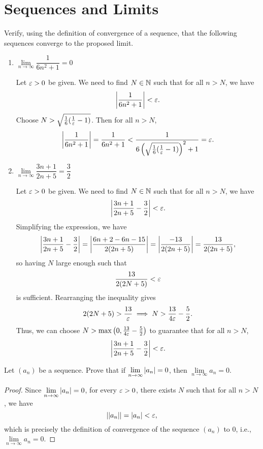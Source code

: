 \section{Sequences and Limits}

\begin{problem}
  Verify, using the definition of convergence of a sequence, that the following
  sequences converge to the proposed limit.

  \begin{enumerate}[label=(\alph*)]
    \item $\lim\limits_{n \to \infty} \dfrac{1}{6n^{2} + 1} = 0$

      Let $\varepsilon > 0$ be given. We need to find $N \in \mathbb{N}$ such that for all $n > N$, we have 
      \[
        \left\lvert \frac{1}{6n^{2} + 1} \right\rvert < \varepsilon.
      \]
      Choose $N > \sqrt{\frac{1}{6}(\frac{1}{\varepsilon} - 1)}$. Then for all $n > N$,
      \[
        \left\lvert \frac{1}{6n^{2} + 1} \right\rvert = \frac{1}{6n^{2} + 1} < \frac{1}{6 \left( \sqrt{\frac{1}{6}(\frac{1}{\varepsilon} - 1)} \right)^{2} + 1} = \varepsilon.
      \]

    \item $\lim\limits_{n \to \infty} \dfrac{3n + 1}{2n + 5} = \dfrac{3}{2}$

      Let $\varepsilon > 0$ be given. We need to find $N \in \mathbb{N}$ such that for all $n > N$, we have 
      \[
        \left\lvert \frac{3n + 1}{2n + 5} - \frac{3}{2} \right\rvert < \varepsilon.
      \]
      Simplifying the expression, we have
      \[
        \left\lvert \frac{3n + 1}{2n + 5} - \frac{3}{2} \right\rvert = \left\lvert \frac{6n + 2 - 6n - 15}{2(2n + 5)} \right\rvert = \left\lvert \frac{-13}{2(2n + 5)} \right\rvert = \frac{13}{2(2n + 5)},
      \]
      so having $N$ large enough such that
      \[
        \frac{13}{2(2N + 5)} < \varepsilon
      \]
      is sufficient. Rearranging the inequality gives 
      \[
        2(2N + 5) > \frac{13}{\varepsilon} \implies N > \frac{13}{4\varepsilon} - \frac{5}{2}.
      \]
      Thus, we can choose $N > \max\left(0, \frac{13}{4\varepsilon} - \frac{5}{2}\right)$ to 
      guarantee that for all $n > N$,
      \[
        \left\lvert \frac{3n + 1}{2n + 5} - \frac{3}{2} \right\rvert < \varepsilon.
      \]
  \end{enumerate}

\end{problem}

\begin{problem}
  Let $(a_{n})$ be a sequence. Prove that if $\lim\limits_{n \to \infty} \left\lvert a_{n} \right\rvert = 0$, 
  then $\lim\limits_{n \to \infty} a_{n} = 0$.

  \begin{proof}
    Since $\lim\limits_{n \to \infty} \left\lvert a_{n} \right\rvert = 0$, for every $\varepsilon > 0$, there exists $N$ 
    such that for all $n > N$, we have
    \[
      \left\lvert  \left\lvert  a_{n}  \right\rvert  \right\rvert = \left\lvert a_{n} \right\rvert < \varepsilon,
    \]
    which is precisely the definition of convergence of the sequence $(a_{n})$ to $0$, i.e., 
    $\lim\limits_{n \to \infty} a_{n} = 0$.
  \end{proof}

\end{problem}

